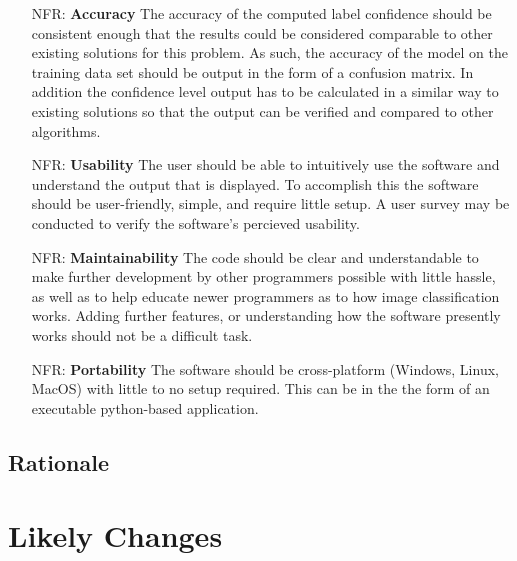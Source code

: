 \documentclass[12pt]{article}
\newcounter{nfrnum} %
\begin{document}
\noindent \begin{itemize}

\item[NFR\refstepcounter{nfrnum}\thenfrnum \label{NFR_Accuracy}:]
  \textbf{Accuracy} The accuracy of the computed label confidence should be consistent enough that the results 
  could be considered comparable to other existing solutions for this problem. As such, the accuracy of the model
  on the training data set should be output in the form of a confusion matrix. In addition the confidence level output has to
  be calculated in a similar way to existing solutions so that the output can be verified and compared to other algorithms.

\item[NFR\refstepcounter{nfrnum}\thenfrnum \label{NFR_Usability}:] \textbf{Usability}
  The user should be able to intuitively use the software and understand the output that is displayed.
  To accomplish this the software should be user-friendly, simple, and require little setup. A user survey
  may be conducted to verify the software's percieved usability.

\item[NFR\refstepcounter{nfrnum}\thenfrnum \label{NFR_Maintainability}:]
  \textbf{Maintainability} The code should be clear and understandable to make further development by other programmers 
  possible with little hassle, as well as to help educate newer programmers as to how image classification works.
  Adding further features, or understanding how the software presently works should not be a difficult task.


\item[NFR\refstepcounter{nfrnum}\thenfrnum \label{NFR_Portability}:]
  \textbf{Portability} The software should be cross-platform (Windows, Linux, MacOS) with little to no setup
  required. This can be in the the form of an executable python-based application.

\end{itemize}

\subsection{Rationale}


\section{Likely Changes}
\end{document}
